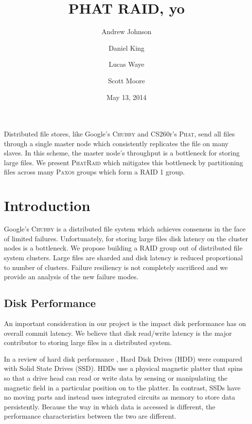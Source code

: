 \documentclass[10pt,letter]{article}
\newcommand{\chubby}[0]{\textsc{Chubby}}
\newcommand{\phat}[0]{\textsc{Phat}}
\newcommand{\phatraid}[0]{\textsc{PhatRaid}}
\newcommand{\raid}[1]{\textsc{RAID #1}}
\newcommand{\paxos}[0]{\textsc{Paxos}}
\begin{document}
\title{PHAT RAID, yo}
\author{Andrew Johnson \and Daniel King \and Lucas Waye \and Scott Moore}
\date{May 13, 2014}

\maketitle

Distributed file stores, like Google's \chubby{} and CS260r's \phat{}, send all
files through a single master node which consistently replicates the file on
many slaves. In this scheme, the master node's throughput is a bottleneck for
storing large files. We present \phatraid{} which mitigates this bottleneck by
partitioning files across many \paxos{} groups which form a \raid{1} group.

\section{Introduction}

Google's \chubby{}\cite{burrows-chubby} is a distributed file system which
achieves consensus in the face of limited failures. Unfortunately, for storing
large files disk latency on the cluster nodes is a bottleneck. We propose
building a RAID group out of distributed file system clusters. Large files are
sharded and disk latency is reduced proportional to number of clusters. Failure
resiliency is not completely sacrificed and we provide an analysis of the
new failure modes.

\subsection{Disk Performance}

An important consideration in our project is the impact disk performance has on overall commit latency. We believe that disk read/write latency is the major contributor to storing large files in a distributed system.

In a review of hard disk performance \cite{disk-perf}, Hard Disk Drives (HDD) were compared with Solid State Drives (SSD). HDDs use a physical magnetic platter that spins so that a drive head can read or write data by sensing or manipulating the magnetic field in a particular position on to the platter. In contrast, SSDs have no moving parts and instead uses integrated circuits as memory to store data persistently. Because the way in which data is accessed is different, the performance characteristics between the two are different.
\end{document}
